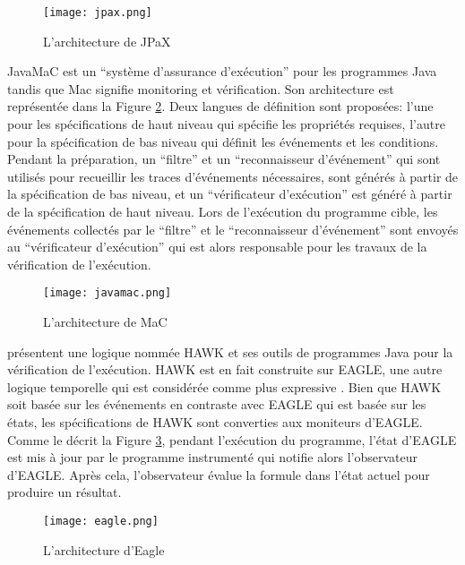 \begin{figure}[h]
\begin{center}
\centering
\texttt{[image: jpax.png]}
\caption{L'architecture de JPaX \citep{havelund2001java}}
\label{img:jpax}
\end{center}
\end{figure}

JavaMaC \citep{kim2004java} est un ``système d'assurance d'exécution'' pour les programmes Java tandis que Mac signifie monitoring et vérification. Son architecture est représentée dans la Figure \ref{img:javamac}. Deux langues de définition sont proposées: l'une pour les spécifications de haut niveau qui spécifie les propriétés requises, l'autre pour la spécification de bas niveau qui définit les événements et les conditions. Pendant la préparation, un ``filtre'' et un ``reconnaisseur d'événement'' qui sont utilisés pour recueillir les traces d'événements nécessaires, sont générés à partir de la spécification de bas niveau, et un ``vérificateur d'exécution'' est généré à partir de la spécification de haut niveau. Lors de l'exécution du programme cible, les événements collectés par le ``filtre'' et le ``reconnaisseur d'événement'' sont envoyés au ``vérificateur d'exécution'' qui est alors responsable pour les travaux de la vérification de l'exécution.

\begin{figure}[h]
\begin{center}
\centering
\texttt{[image: javamac.png]}
\caption{L'architecture de MaC \citep{kim2004java}}
\label{img:javamac}
\end{center}
\end{figure}

\cite{d2005event} présentent une logique nommée HAWK et ses outils de programmes Java pour la vérification de l'exécution. HAWK est en fait construite sur EAGLE, une autre logique temporelle qui est considérée comme plus expressive \citep{barringer2004rule}. Bien que HAWK soit basée sur les événements en contraste avec EAGLE qui est basée sur les états, les spécifications de HAWK sont converties aux moniteurs d'EAGLE. Comme le décrit la Figure \ref{img:eagle}, pendant l'exécution du programme, l'état d'EAGLE est mis à jour par le programme instrumenté qui notifie alors l'observateur d'EAGLE. Après cela, l'observateur évalue la formule dans l'état actuel pour produire un résultat.

\begin{figure}[h]
\begin{center}
\centering
\texttt{[image: eagle.png]}
\caption{L'architecture d'Eagle \citep{d2005event}}
\label{img:eagle}
\end{center}
\end{figure}

